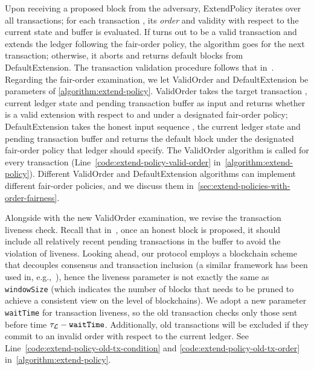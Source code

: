 Upon receiving a proposed block from the adversary, \textsf{ExtendPolicy} iterates over all transactions; for each transaction \tx, its \emph{order} and validity with respect to the current state and buffer is evaluated.
%
If \tx turns out to be a valid transaction and extends the ledger following the fair-order policy, the algorithm goes for the next transaction; otherwise, it aborts and returns default blocks from \textsf{DefaultExtension}.
%
The transaction validation procedure follows that in~\cite{C:BMTZ17}.
%
Regarding the fair-order examination, we let \textsf{ValidOrder} and \textsf{DefaultExtension} be parameters of \cref{algorithm:extend-policy}.
%
\textsf{ValidOrder} takes the target transaction \tx, current ledger state \state and pending transaction buffer \buffer as input and returns whether \tx is a valid extension with respect to \state and \buffer under a designated fair-order policy; \textsf{DefaultExtension} takes the honest input sequence \honestInputSeq, the current ledger state \state and pending transaction buffer \buffer and returns the default block under the designated fair-order policy that ledger \funcFairLedger should specify.
%
The \textsf{ValidOrder} algorithm is called for every transaction (Line~\ref*{code:extend-policy-valid-order} in~\cref{algorithm:extend-policy}).
%
Different \textsf{ValidOrder} and \textsf{DefaultExtension} algorithms can implement different fair-order policies, and we discuss them in~\cref{sec:extend-policies-with-order-fairness}.

Alongside with the new \textsf{ValidOrder} examination, we revise the transaction liveness check.
%
Recall that in~\cite{C:BMTZ17}, once an honest block is proposed, it should include all relatively recent pending transactions in the buffer to avoid the violation of liveness.
%
Looking ahead, our protocol employs a blockchain scheme that decouples consensus and transaction inclusion (a similar framework has been used in, e.g.,~\cite{PODC:PasShi17,TCC:FGKR20}), hence the liveness parameter is not exactly the same as \texttt{windowSize} (which indicates the number of blocks that needs to be pruned to achieve a consistent view on the level of blockchains).
%
We adopt a new parameter \texttt{waitTime} for transaction liveness, so the old transaction checks only those sent before time $\tau_\mathcal{L} - \mathtt{waitTime}$.
%
Additionally, old transactions will be excluded if they commit to an invalid order with respect to the current ledger.
%
See Line~\ref*{code:extend-policy-old-tx-condition} and \ref*{code:extend-policy-old-tx-order} in~\cref{algorithm:extend-policy}.

